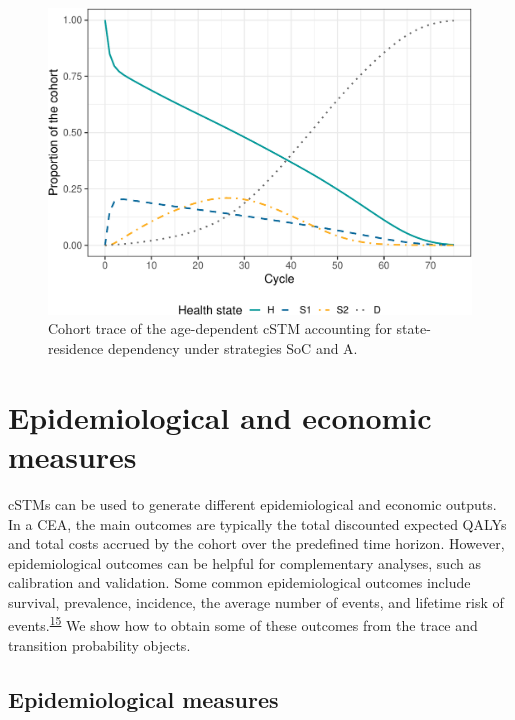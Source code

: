 \documentclass[
]{article}
\begin{document}
\begin{figure}[H]

{\centering \includegraphics{figs/Sick-Sicker-Trace-HistDep-1} 

}

\caption{Cohort trace of the age-dependent cSTM accounting for state-residence dependency under strategies SoC and A.}\label{fig:Sick-Sicker-Trace-HistDep}
\end{figure}

\hypertarget{epidemiological-and-economic-measures}{%
\section{Epidemiological and economic measures}\label{epidemiological-and-economic-measures}}

cSTMs can be used to generate different epidemiological and economic outputs. In a CEA, the main outcomes are typically the total discounted expected QALYs and total costs accrued by the cohort over the predefined time horizon. However, epidemiological outcomes can be helpful for complementary analyses, such as calibration and validation. Some common epidemiological outcomes include survival, prevalence, incidence, the average number of events, and lifetime risk of events.\textsuperscript{\protect\hyperlink{ref-Siebert2012c}{15}} We show how to obtain some of these outcomes from the trace and transition probability objects.

\hypertarget{epidemiological-measures}{%
\subsection{Epidemiological measures}\label{epidemiological-measures}}
\end{document}
